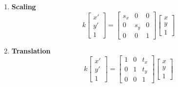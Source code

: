 \documentclass{book}
\begin{document}
                \begin{enumerate}
                    \item \textbf{Scaling} \begin{equation}
                        k\begin{bmatrix}
                            x'\\ 
                            y'\\ 
                            1
                            \end{bmatrix} = 
                            \begin{bmatrix}
                            s_{x} & 0 & 0\\ 
                            0 & s_{y} & 0\\ 
                            0 & 0 & 1
                            \end{bmatrix}
                            \begin{bmatrix}
                            x\\ 
                            y\\ 
                            1
                            \end{bmatrix}
                    \end{equation}
                    \item \textbf{Translation} \begin{equation}
                        k\begin{bmatrix}
                            x'\\ 
                            y'\\ 
                            1
                            \end{bmatrix} = 
                            \begin{bmatrix}
                            1 & 0 & t_{x}\\ 
                            0 & 1 & t_{y}\\ 
                            0 & 0 & 1
                            \end{bmatrix}
                            \begin{bmatrix}
                            x\\ 
                            y\\ 
                            1
                            \end{bmatrix}
                    \end{equation}

\end{enumerate}
\end{document}
